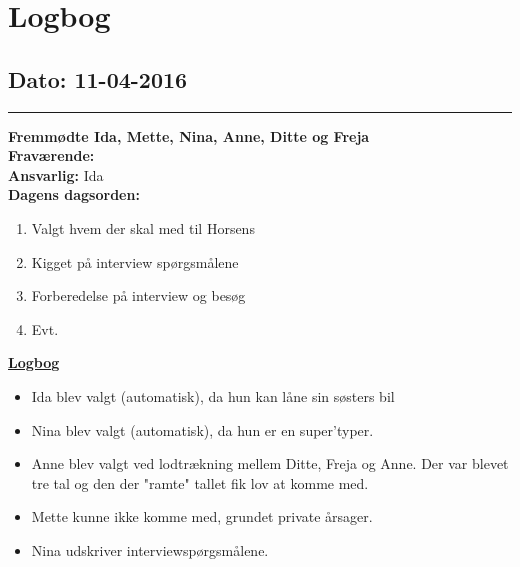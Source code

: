 \chapter{Logbog}
\section{Dato: 11-04-2016}
\hrule
\textbf{Fremmødte Ida, Mette, Nina, Anne, Ditte og Freja} \\
\textbf{Fraværende:} \\
\textbf{Ansvarlig:} Ida  \\
\textbf{Dagens dagsorden: }
\begin{enumerate}
	\item Valgt hvem der skal med til Horsens
	\item Kigget på interview spørgsmålene
	\item Forberedelse på interview og besøg 
	\item Evt. 
\end{enumerate}

\underline{\textbf{Logbog}}
\begin{itemize}
\item Ida blev valgt (automatisk), da hun kan låne sin søsters bil
\item Nina blev valgt (automatisk), da hun er en super'typer.
\item Anne blev valgt ved lodtrækning mellem Ditte, Freja og Anne. Der var blevet tre tal og den der "ramte" tallet fik lov at komme med.
\item Mette kunne ikke komme med, grundet private årsager.
\item Nina udskriver interviewspørgsmålene. 
\end{itemize}
\newpage